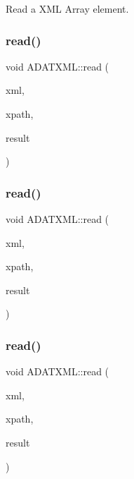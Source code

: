 Read a X\+ML Array element. 

\mbox{\label{group__io_ga745a0160808dcca1ec6805d77979bfcc}} 
\subsubsection{\texorpdfstring{read()}{read()}\hspace{0.1cm}{\footnotesize\ttfamily [25/52]}}
{\footnotesize\ttfamily void A\+D\+A\+T\+X\+M\+L\+::read (\begin{DoxyParamCaption}\item[{\mbox{\hyperlink{classADATXML_1_1XMLReader}{X\+M\+L\+Reader}} \&}]{xml,  }\item[{const std\+::string \&}]{xpath,  }\item[{std\+::vector$<$ unsigned int $>$ \&}]{result }\end{DoxyParamCaption})}

\mbox{\label{group__io_ga5ca3f42dfcdc536156476e7f6d6db61c}} 
\subsubsection{\texorpdfstring{read()}{read()}\hspace{0.1cm}{\footnotesize\ttfamily [26/52]}}
{\footnotesize\ttfamily void A\+D\+A\+T\+X\+M\+L\+::read (\begin{DoxyParamCaption}\item[{\mbox{\hyperlink{classADATXML_1_1XMLReader}{X\+M\+L\+Reader}} \&}]{xml,  }\item[{const std\+::string \&}]{xpath,  }\item[{std\+::vector$<$ short int $>$ \&}]{result }\end{DoxyParamCaption})}

\mbox{\label{group__io_gacd64b080900323aa538c91b95c83248d}} 
\subsubsection{\texorpdfstring{read()}{read()}\hspace{0.1cm}{\footnotesize\ttfamily [27/52]}}
{\footnotesize\ttfamily void A\+D\+A\+T\+X\+M\+L\+::read (\begin{DoxyParamCaption}\item[{\mbox{\hyperlink{classADATXML_1_1XMLReader}{X\+M\+L\+Reader}} \&}]{xml,  }\item[{const std\+::string \&}]{xpath,  }\item[{std\+::vector$<$ unsigned short int $>$ \&}]{result }\end{DoxyParamCaption})}


